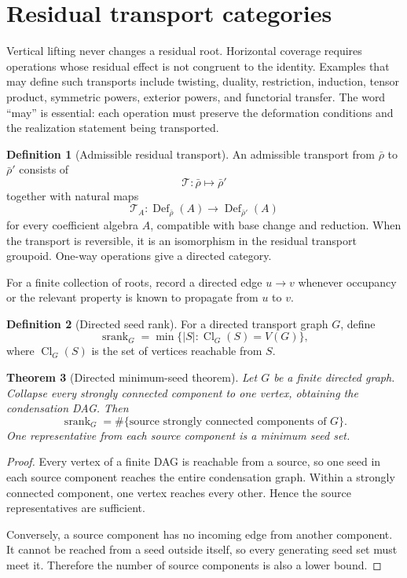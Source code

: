 \documentclass[11pt]{article}
\newtheorem{theorem}{Theorem}[section]
\theoremstyle{definition}
\newtheorem{definition}[theorem]{Definition}
\theoremstyle{remark}
\newcommand{\Def}{\operatorname{Def}}
\newcommand{\srank}{\operatorname{srank}}
\newcommand{\Cl}{\operatorname{Cl}}
\begin{document}
\section{Residual transport categories}

Vertical lifting never changes a residual root.  Horizontal coverage requires operations whose residual effect is not congruent to the identity.  Examples that may define such transports include twisting, duality, restriction, induction, tensor product, symmetric powers, exterior powers, and functorial transfer.  The word ``may'' is essential: each operation must preserve the deformation conditions and the realization statement being transported.

\begin{definition}[Admissible residual transport]
An admissible transport from \(\bar\rho\) to \(\bar\rho'\) consists of
\[
\mathcal T:\bar\rho\longmapsto\bar\rho'
\]
together with natural maps
\[
\mathcal T_A:\Def_{\bar\rho}(A)\longrightarrow\Def_{\bar\rho'}(A)
\]
for every coefficient algebra \(A\), compatible with base change and reduction.  When the transport is reversible, it is an isomorphism in the residual transport groupoid.  One-way operations give a directed category.
\end{definition}

For a finite collection of roots, record a directed edge \(u\to v\) whenever occupancy or the relevant property is known to propagate from \(u\) to \(v\).

\begin{definition}[Directed seed rank]
For a directed transport graph \(G\), define
\[
\srank_G
=
\min\{|S|:\Cl_G(S)=V(G)\},
\]
where \(\Cl_G(S)\) is the set of vertices reachable from \(S\).
\end{definition}

\begin{theorem}[Directed minimum-seed theorem]
Let \(G\) be a finite directed graph.  Collapse every strongly connected component to one vertex, obtaining the condensation DAG.  Then
\[
\boxed{
\srank_G
=
\#\{\text{source strongly connected components of }G\}.
}
\]
One representative from each source component is a minimum seed set.
\end{theorem}

\begin{proof}
Every vertex of a finite DAG is reachable from a source, so one seed in each source component reaches the entire condensation graph.  Within a strongly connected component, one vertex reaches every other.  Hence the source representatives are sufficient.

Conversely, a source component has no incoming edge from another component.  It cannot be reached from a seed outside itself, so every generating seed set must meet it.  Therefore the number of source components is also a lower bound.
\end{proof}
\end{document}
